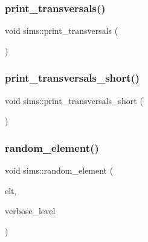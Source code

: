 \subsubsection{\texorpdfstring{print\+\_\+transversals()}{print\_transversals()}}
{\footnotesize\ttfamily void sims\+::print\+\_\+transversals (\begin{DoxyParamCaption}{ }\end{DoxyParamCaption})}

\mbox{\label{classsims_a817d3d28dddde6291dd166eed121057e}} 
\subsubsection{\texorpdfstring{print\+\_\+transversals\+\_\+short()}{print\_transversals\_short()}}
{\footnotesize\ttfamily void sims\+::print\+\_\+transversals\+\_\+short (\begin{DoxyParamCaption}{ }\end{DoxyParamCaption})}

\mbox{\label{classsims_a28e72977652add0bb45a5f703243fd33}} 
\subsubsection{\texorpdfstring{random\+\_\+element()}{random\_element()}}
{\footnotesize\ttfamily void sims\+::random\+\_\+element (\begin{DoxyParamCaption}\item[{\mbox{\hyperlink{galois_8h_a09fddde158a3a20bd2dcadb609de11dc}{I\+NT}} $\ast$}]{elt,  }\item[{\mbox{\hyperlink{galois_8h_a09fddde158a3a20bd2dcadb609de11dc}{I\+NT}}}]{verbose\+\_\+level }\end{DoxyParamCaption})}

\mbox{\label{classsims_a5813a13a4b5685f8bab7d248fb12cf57}} 
